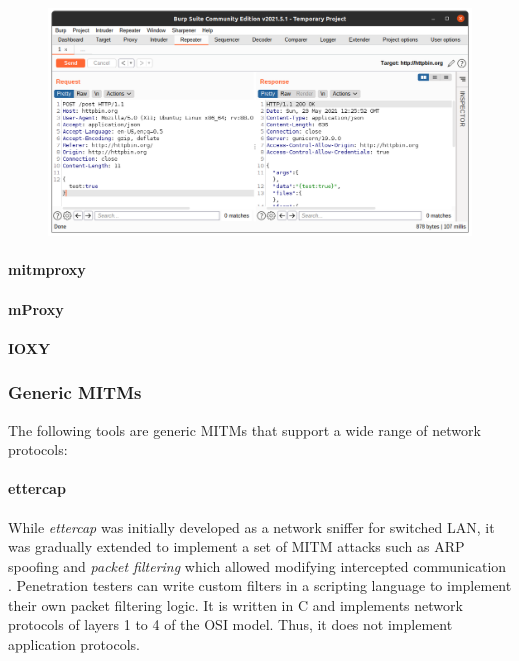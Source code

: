 \begin{figure}[h]
    \centering
    \includegraphics[width=14cm]{img/ch03/burpsuite.png}
    \label{fig:burpsuite}
\end{figure}
\paragraph{mitmproxy} %
\paragraph{mProxy}
\paragraph{IOXY}
\subsubsection{Generic \acp{MITM}}
The following tools are generic \acp{MITM} that support a wide range of network protocols:
\paragraph{ettercap} While \emph{ettercap} was initially developed as a network sniffer for switched \ac{LAN}, it was gradually extended to implement a set of \ac{MITM} attacks such as \ac{ARP} spoofing and \emph{packet filtering} which allowed modifying intercepted communication \cite{ettercap}. Penetration testers can write custom filters in a scripting language to implement their own packet filtering logic. It is written in C and implements network protocols of layers 1 to 4 of the \ac{OSI} model. Thus, it does not implement application protocols.

